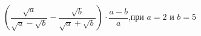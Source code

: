 \begin{ex}[type=calculate_expression]
	\begin{condition}
		\( \left( \dfrac{\sqrt{a}}{\sqrt{a}-\sqrt{b}}-\dfrac{\sqrt{b}}{\sqrt{a}+\sqrt{b}} \right)\cdot\dfrac{a-b}{a} \),\quad при \( a=2 \) и \( b=5 \)
	\end{condition}
\end{ex}